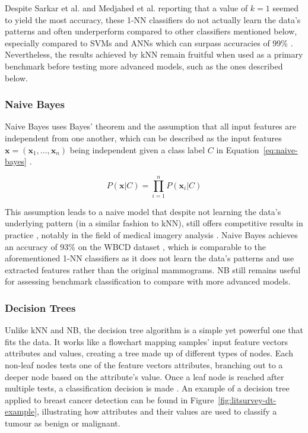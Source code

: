 Despite Sarkar et al. and Medjahed et al. reporting that a value of $k=1$ seemed to yield the most accuracy, these 1-NN classifiers do not actually learn the data's patterns and often underperform compared to other classifiers mentioned below, especially compared to SVMs and ANNs which can surpass accuracies of 99\% \citep{Yue2018, Asri2016, Montazeri2016}. Nevertheless, the results achieved by kNN remain fruitful when used as a primary benchmark before testing more advanced models, such as the ones described below.

\subsubsection{Naive Bayes}

Naive Bayes uses Bayes' theorem and the assumption that all input features are independent from one another, which can be described as the input features $\textbf{x}=(\textbf{x}_1, ..., \textbf{x}_n)$ being independent given a class label $C$ in Equation~\ref{eq:naive-bayes} \citep{rish2001empirical}.

\begin{equation}
\label{eq:naive-bayes}
    P(\textbf{x}|C)=\prod_{i=1}^{n}P(\textbf{x}_i|C)
\end{equation}

This assumption leads to a naive model that despite not learning the data's underlying pattern (in a similar fashion to kNN), still offers competitive results in practice \citep{russell2002artificial}, notably in the field of medical imagery analysis \citep{rish2001empirical}. Naive Bayes achieves an accuracy of 93\% on the WBCD dataset \citep{Kharya2014}, which is comparable to the aforementioned 1-NN classifiers as it does not learn the data's patterns and use extracted features rather than the original mammograms. NB still remains useful for assessing benchmark classification to compare with more advanced models.

\subsubsection{Decision Trees}
\label{sec:litsurvey-dts}

Unlike kNN and NB, the decision tree algorithm is a simple yet powerful one that fits the data. It works like a flowchart mapping samples' input feature vectors attributes and values, creating a tree made up of different types of nodes. Each non-leaf nodes tests one of the feature vectors attributes, branching out to a deeper node based on the attribute's value. Once a leaf node is reached after multiple tests, a classification decision is made \citep{quinlan2014c4}. An example of a decision tree applied to breast cancer detection can be found in Figure~\ref{fig:litsurvey-dt-example}, illustrating how attributes and their values are used to classify a tumour as benign or malignant.\\


